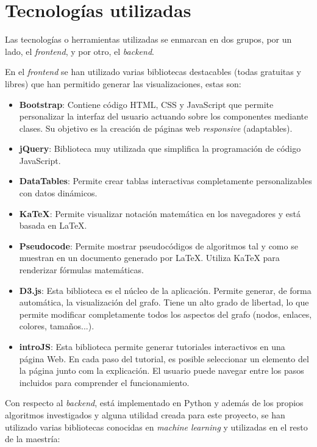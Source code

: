 \section{Tecnologías utilizadas}

Las tecnologías o herramientas utilizadas se enmarcan en dos grupos, por un lado, el \textit{frontend}, y por otro, el \textit{backend}.

En el \textit{frontend} se han utilizado varias bibliotecas destacables (todas gratuitas y libres) que han permitido generar las visualizaciones, estas son:

\begin{itemize}
    \item \textbf{Bootstrap}: Contiene código HTML, CSS y JavaScript que permite personalizar la interfaz del usuario actuando sobre los componentes mediante clases. Su objetivo es la creación de páginas web \textit{responsive} (adaptables). 
    \item     \textbf{jQuery}: Biblioteca muy utilizada que simplifica la programación de código JavaScript.
    \item \textbf{DataTables}: Permite crear tablas interactivas completamente personalizables con datos dinámicos.
    \item     \textbf{KaTeX}: Permite visualizar notación matemática en los navegadores y está basada en LaTeX.
    \item \textbf{Pseudocode}: Permite mostrar pseudocódigos de algoritmos tal y como se muestran en un documento generado por LaTeX. Utiliza KaTeX para renderizar fórmulas matemáticas.
    \item \textbf{D3.js}: Esta biblioteca es el núcleo de la aplicación. Permite generar, de forma automática, la visualización del grafo. Tiene un alto grado de libertad, lo que permite modificar completamente todos los aspectos del grafo (nodos, enlaces, colores, tamaños...).
    \item \textbf{introJS}: Esta biblioteca permite generar tutoriales interactivos en una página Web. En cada paso del tutorial, es posible seleccionar un elemento del la página junto com la explicación. El usuario puede navegar entre los pasos incluidos para comprender el funcionamiento.
\end{itemize}

Con respecto al \textit{backend}, está implementado en Python y además de los propios algoritmos investigados y alguna utilidad creada para este proyecto, se han utilizado varias bibliotecas conocidas en \textit{machine learning} y utilizadas en el resto de la maestría:

